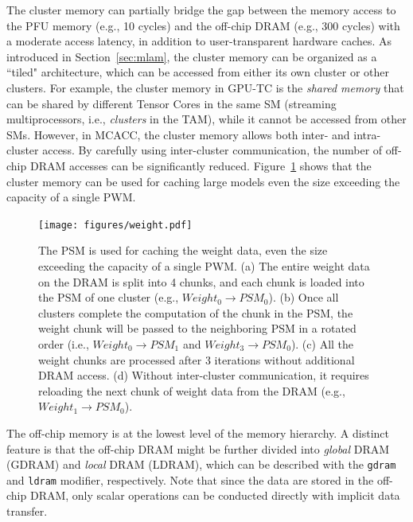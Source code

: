 The cluster memory can partially bridge the gap between the memory access to the PFU memory (e.g., 10 cycles) and the off-chip DRAM (e.g., 300 cycles) with a moderate access latency, in addition to user-transparent hardware caches. As introduced in Section~\ref{sec:mlam}, the cluster memory can be organized as a ``tiled" architecture, which can be accessed from either its own cluster or other clusters. For example, the cluster memory in GPU-TC is the \emph{shared memory} that can be shared by different Tensor Cores in the same SM (streaming multiprocessors, i.e., \emph{clusters} in the TAM), while it cannot be accessed from other SMs. However, in MCACC, the cluster memory allows both inter- and intra-cluster access. By carefully using inter-cluster communication, the number of off-chip DRAM accesses can be significantly reduced. Figure~\ref{fig:weight} shows that the cluster memory can be used for caching large models even the size exceeding the capacity of a single PWM.


\begin{figure}
  \begin{center}
\texttt{[image: figures/weight.pdf]}
\end{center}
\vspace{-18pt}
\caption{\footnotesize The PSM is used for caching the weight data, even the size exceeding the capacity of a single PWM. (a) The entire weight data on the DRAM is split into 4 chunks, and each chunk is loaded into the PSM of one cluster (e.g., $Weight_0 \to PSM_0$). (b) Once all clusters complete the computation of the chunk in the PSM, the weight chunk will be passed to the neighboring PSM in a rotated order (i.e., $Weight_0 \to PSM_1$ and $Weight_3 \to PSM_0$). (c) All the weight chunks are processed after $3$ iterations without additional DRAM access. (d) Without inter-cluster communication, it requires reloading the next chunk of weight data from the DRAM (e.g., $Weight_1 \to PSM_0$).}
\label{fig:weight}
\vspace{-15pt}
\end{figure}

The off-chip memory is at the lowest level of the memory hierarchy. A distinct feature is that the off-chip DRAM might be further divided into \emph{global} DRAM (GDRAM) and \emph{local} DRAM (LDRAM), which can be described with the \texttt{gdram} and \texttt{ldram} modifier, respectively. Note that since the data are stored in the off-chip DRAM, only scalar operations can be conducted directly with implicit data transfer.



